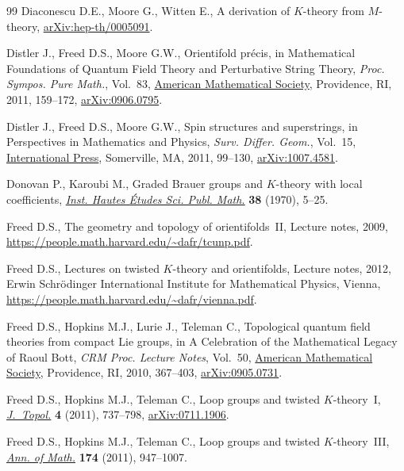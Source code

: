 \begin{thebibliography}{99}
Diaconescu D.E., Moore G., Witten E., A derivation of {$K$}-theory from
 {$M$}-theory,
 \href{http://arxiv.org/abs/hep-th/0005091}{arXiv:hep-th/0005091}.

Distler J., Freed D.S., Moore G.W., Orientifold pr\'ecis, in Mathematical
 {F}oundations of {Q}uantum {F}ield {T}heory and {P}erturbative {S}tring
 {T}heory, \textit{Proc. Sympos. Pure Math.}, Vol.~83,
 \href{https://doi.org/10.1090/pspum/083/2742428}{American Mathematical
 Society}, Providence, RI, 2011, 159--172,
 \href{http://arxiv.org/abs/0906.0795}{arXiv:0906.0795}.

Distler J., Freed D.S., Moore G.W., Spin structures and superstrings, in
 {P}erspectives in {M}athematics and {P}hysics, \textit{Surv. Differ. Geom.},
 Vol.~15, \href{https://doi.org/10.4310/SDG.2010.v15.n1.a4}{International
 Press}, Somerville, MA, 2011, 99--130,
 \href{http://arxiv.org/abs/1007.4581}{arXiv:1007.4581}.

Donovan P., Karoubi M., Graded {B}rauer groups and {$K$}-theory with local
 coefficients, \href{https://doi.org/10.1007/BF02684650}{\textit{Inst. Hautes
 \'{E}tudes Sci. Publ. Math.}} \textbf{38} (1970), 5--25.

Freed D.S., The geometry and topology of orientifolds~{II}, {L}ecture notes,
 2009, \url{https://people.math.harvard.edu/~dafr/tcunp.pdf}.

Freed D.S., Lectures on twisted {$K$}-theory and orientifolds, {L}ecture notes,
 2012, Erwin Schr\"{o}dinger International Institute for Mathematical Physics,
 Vienna, \url{https://people.math.harvard.edu/~dafr/vienna.pdf}.

Freed D.S., Hopkins M.J., Lurie J., Teleman C., Topological quantum field
 theories from compact {L}ie groups, in A {C}elebration of the {M}athematical
 {L}egacy of {R}aoul {B}ott, \textit{CRM Proc. Lecture Notes}, Vol.~50,
 \href{https://doi.org/10.1090/crmp/050/26}{American Mathematical Society},
 Providence, RI, 2010, 367--403,
 \href{http://arxiv.org/abs/0905.0731}{arXiv:0905.0731}.

Freed D.S., Hopkins M.J., Teleman C., Loop groups and twisted {$K$}-theory~{I},
 \href{https://doi.org/10.1112/jtopol/jtr019}{\textit{J.~Topol.}} \textbf{4}
 (2011), 737--798, \href{http://arxiv.org/abs/0711.1906}{arXiv:0711.1906}.

Freed D.S., Hopkins M.J., Teleman C., Loop groups and twisted
 {$K$}-theory~{III},
 \href{https://doi.org/10.4007/annals.2011.174.2.5}{\textit{Ann. of Math.}}
 \textbf{174} (2011), 947--1007.


\end{thebibliography}
